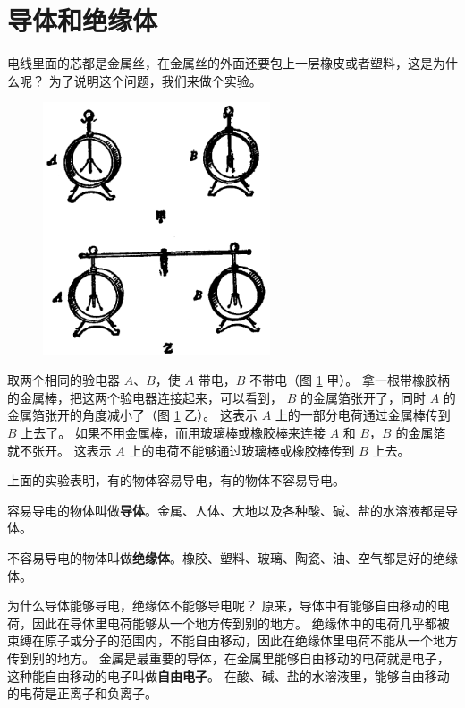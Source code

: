 \section{导体和绝缘体}\label{sec:7-3}

电线里面的芯都是金属丝，在金属丝的外面还要包上一层橡皮或者塑料，这是为什么呢？
为了说明这个问题，我们来做个实验。

\begin{figure}[htbp]
    \centering
    \includegraphics[width=0.6\textwidth]{../pic/czwl2-ch7-8}
    \caption{}\label{fig:7-8}
\end{figure}

取两个相同的验电器 $A$、$B$，使 $A$ 带电，$B$ 不带电（图 \ref{fig:7-8} 甲）。
拿一根带橡胶柄的金属棒，把这两个验电器连接起来，可以看到，
$B$ 的金属箔张开了，同时 $A$ 的金属箔张开的角度减小了（图 \ref{fig:7-8} 乙）。
这表示 $A$ 上的一部分电荷通过金属棒传到 $B$ 上去了。
如果不用金属棒，而用玻璃棒或橡胶棒来连接 $A$ 和 $B$，$B$ 的金属箔就不张开。
这表示 $A$ 上的电荷不能够通过玻璃棒或橡胶棒传到 $B$ 上去。

上面的实验表明，有的物体容易导电，有的物体不容易导电。

容易导电的物体叫做\textbf{导体}。金属、人体、大地以及各种酸、碱、盐的水溶液都是导体。

不容易导电的物体叫做\textbf{绝缘体}。橡胶、塑料、玻璃、陶瓷、油、空气都是好的绝缘体。

为什么导体能够导电，绝缘体不能够导电呢？
原来，导体中有能够自由移动的电荷，因此在导体里电荷能够从一个地方传到别的地方。
绝缘体中的电荷几乎都被束缚在原子或分子的范围内，不能自由移动，因此在绝缘体里电荷不能从一个地方传到别的地方。
金属是最重要的导体，在金属里能够自由移动的电荷就是电子，这种能自由移动的电子叫做\textbf{自由电子}。
在酸、碱、盐的水溶液里，能够自由移动的电荷是正离子和负离子。

